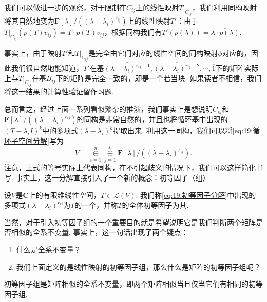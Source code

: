 我们可以做进一步的观察，对于限制在$C_{ij}$上的线性映射$T|_{C_{ij}}$，我们利用同构映射将其自然地变为$\mathbf{F}[\lambda]/((\lambda-\lambda_i)^{r_{ij}})$上的线性映射$T'$：由于$T|_{C_{ij}}(p(T)v_{ij})=T\cdot p(T)v_{ij}$，根据同构我们有$T'(p(\lambda))=\overline{\lambda\cdot p(\lambda)}$.

事实上，由于映射$T'$和$T|_{C_{ij}}$是完全由它们对应的线性空间的同构映射$\phi$对应的，因此我们很自然地能知道，$T'$在基$\overline{(\lambda-\lambda_i)^{r_{ij}-1}},\overline{(\lambda-\lambda_i)^{r_{ij}-2}},\cdots,\overline{1}$下的矩阵实际上与$T|_{C_{ij}}$在基$B_{ij}$下的矩阵是完全一致的，即是一个若当块. 如果读者不相信，我们将这一结果的计算性验证留作习题.

总而言之，经过上面一系列看似繁杂的推演，我们事实上是想说明$C_{ij}$和$\mathbf{F}[\lambda]/((\lambda-\lambda_i)^{r_{ij}})$的同构是非常自然的，并且也将循环基中出现的$(T-\lambda_i I)^k$中的多项式$(\lambda-\lambda_i)^k$提取出来. 利用这一同构，我们可以将\autoref{eq:19:循环子空间分解}写为
\begin{equation} \label{eq:19:初等因子分解}
    V=\mathop{\oplus}\limits_{i=1}^n\mathop{\oplus}\limits_{j=1}^{s_i} \mathbf{F}[\lambda]/((\lambda-\lambda_i)^{r_{ij}}).
\end{equation}
注意，上式的等号实际上代表同构，在不引起歧义的情况下，我们可以这样简化书写. 事实上，这一分解直接引入了一个新的概念：初等因子（组）.
\begin{definition}
    设$V$是$\mathbf{C}$上的有限维线性空间，$T\in\mathcal{L}(V)$. 我们称\autoref{eq:19:初等因子分解}中出现的多项式$(\lambda-\lambda_i)^{r_{ij}}$为$T$的一个，并称$T$的全体初等因子为其.
\end{definition}

当然，对于引入初等因子组的一个重要目的就是希望说明它是我们判断两个矩阵是否相似的全系不变量. 事实上，这一句话出现了两个疑点：
\begin{enumerate}
    \item 什么是全系不变量？
    \item 我们上面定义的是线性映射的初等因子组，那么什么是矩阵的初等因子组呢？
\end{enumerate}

\begin{theorem}
    初等因子组是矩阵相似的全系不变量，即两个矩阵相似当且仅当它们有相同的初等因子组.
\end{theorem}

